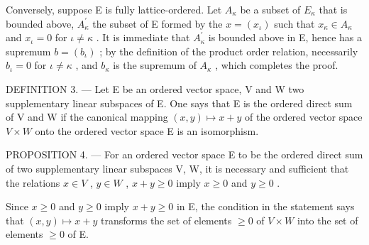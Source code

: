 Conversely, suppose E is fully lattice-ordered. Let \(A_{\kappa}\) be a subset of \(E_{\kappa}\) that is bounded above, \(A_{\kappa}^{\prime}\) the subset of E formed by the \(x = (x_{\iota})\) such that \(x_{\kappa} \in A_{\kappa}\) and \(x_{\iota} = 0\) for \(\iota \neq \kappa\) . It is immediate that \(A_{\kappa}^{\prime}\) is bounded above in E, hence has a supremum \(b = (b_{\iota})\) ; by the definition of the product order relation, necessarily \(b_{\iota} = 0\) for \(\iota \neq \kappa\) , and \(b_{\kappa}\) is the supremum of \(A_{\kappa}\) , which completes the proof.

DEFINITION 3. --- Let E be an ordered vector space, V and W two supplementary linear subspaces of E. One says that E is the ordered direct sum of V and W if the canonical mapping \((x,y)\mapsto x+y\) of the ordered vector space \(V\times W\) onto the ordered vector space E is an isomorphism.

PROPOSITION 4. --- For an ordered vector space E to be the ordered direct sum of two supplementary linear subspaces V, W, it is necessary and sufficient that the relations \(x \in V\) , \(y \in W\) , \(x + y \geqslant 0\) imply \(x \geqslant 0\) and \(y \geqslant 0\) .

Since \(x \geqslant 0\) and \(y \geqslant 0\) imply \(x + y \geqslant 0\) in E, the condition in the statement says that \((x, y) \mapsto x + y\) transforms the set of elements \(\geqslant 0\) of \(V \times W\) into the set of elements \(\geqslant 0\) of E.

